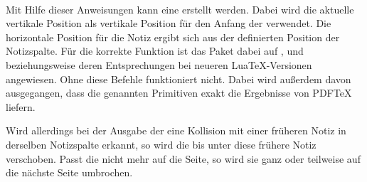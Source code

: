 \begin{Declaration}
  \\
\end{Declaration}
Mit Hilfe dieser Anweisungen kann eine  erstellt werden. Dabei
wird die aktuelle vertikale Position als vertikale Position für den Anfang der
 verwendet. Die horizontale Position für die Notiz ergibt sich
aus der definierten Position der Notizspalte. Für die korrekte Funktion ist
das Paket dabei auf ,
 und
 beziehungsweise deren
Entsprechungen bei neueren Lua\TeX-Versionen angewiesen. Ohne diese Befehle
funktioniert  nicht. Dabei wird außerdem davon
ausgegangen, dass die genannten Primitiven exakt die Ergebnisse von PDF\TeX{}
liefern.

Wird allerdings bei der Ausgabe der  eine
Kollision mit einer früheren Notiz in derselben
Notizspalte erkannt, so wird die  bis unter diese frühere Notiz
verschoben. Passt die  nicht mehr auf die
Seite, so wird sie ganz oder
teilweise auf die nächste Seite umbrochen.

